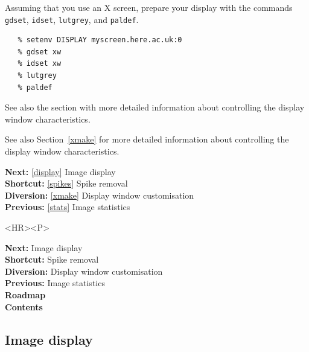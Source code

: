 \documentclass[11pt]{article}
\newenvironment{latexonly}{}{}
\newcommand{\htmlref}[2]{#1}
\newcommand{\xref}[3]{#1}
\newcommand{\xlabel}[1]{}
\begin{document}
   Assuming that you use an X screen, prepare your display with the commands
{\tt \xref{gdset}{sun95}{GDSET}},
{\tt \xref{idset}{sun95}{IDSET}},
{\tt \xref{lutgrey}{sun95}{LUTGREY}},
   and
{\tt \xref{paldef}{sun95}{PALDEF}}.

\begin{verbatim}
   % setenv DISPLAY myscreen.here.ac.uk:0
   % gdset xw
   % idset xw
   % lutgrey
   % paldef
\end{verbatim}

\begin{htmlonly}
   See also the section with
\htmlref{more detailed information}{xmake}
   about controlling the display window characteristics.
\end{htmlonly}
\begin{latexonly}
   See also
Section~\ref{xmake}
   for more detailed information
   about controlling the display window characteristics.
\end{latexonly}

\begin{latexonly}
{\bf Next:} \ref{display} Image display\\
{\bf Shortcut:} \ref{spikes} Spike removal\\
{\bf Diversion:} \ref{xmake} Display window customisation\\
{\bf Previous:} \ref{stats} Image statistics\\
\end{latexonly}

\begin{htmlonly}
\begin{rawhtml} <HR><P> \end{rawhtml}
{\bf \htmlref{Next:}{display}} Image display\\
{\bf \htmlref{Shortcut:}{spikes}} Spike removal\\
{\bf \htmlref{Diversion:}{xmake}} Display window customisation\\
{\bf \htmlref{Previous:}{stats}} Image statistics\\
{\bf \htmlref{Roadmap}{roadmap}}\\
{\bf \htmlref{Contents}{stardoccontents}}\\
\end{htmlonly}


\subsection{\label{display}\xlabel{display}Image display}
\end{document}
